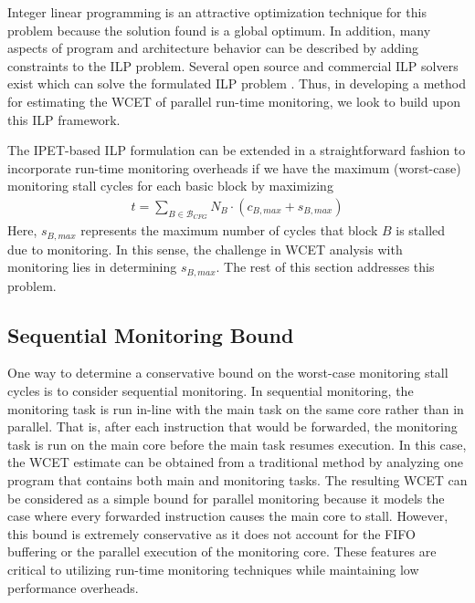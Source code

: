 Integer linear programming is an attractive optimization technique for this
problem because the solution found is a global optimum. In addition, many
aspects of program and architecture behavior can be described by adding
constraints to the ILP problem.  Several open source and commercial ILP solvers
exist which can solve the formulated ILP problem \cite{lpsolve, cplex}.  Thus,
in developing a method for estimating the WCET of parallel run-time monitoring,
we look to build upon this ILP framework.

The IPET-based ILP formulation can be extended in a straightforward fashion to
incorporate run-time monitoring overheads if we have the maximum (worst-case)
monitoring stall cycles for each basic block by maximizing
\begin{align*}
  t = \sum_{B \in \mathcal{B}_{CFG}}{N_{B} \cdot (c_{B,max} + s_{B,max})}
\end{align*}
Here, $s_{B,max}$ represents the maximum number of cycles that block $B$ is
stalled due to monitoring. In this sense, the challenge in WCET analysis with
monitoring lies in determining $s_{B,max}$.  The rest of this section addresses
this problem.

\subsection{Sequential Monitoring Bound}
\label{sec:monitoring_wcet.wcet.sequential}

One way to determine a conservative bound on the worst-case monitoring stall
cycles is to consider sequential monitoring.  In sequential monitoring, the
monitoring task is run in-line with the main task on the same core rather than
in parallel. That is, after each instruction that would be forwarded, the
monitoring task is run on the main core before the main task resumes execution.
In this case, the WCET estimate can be obtained from a traditional method by
analyzing one program that contains both main and monitoring tasks.  The
resulting WCET can be considered as a simple bound for parallel monitoring
because it models the case where every forwarded instruction causes the main
core to stall.  However, this bound is extremely conservative as it does not
account for the FIFO buffering or the parallel execution of the monitoring
core. These features are critical to utilizing run-time monitoring techniques
while maintaining low performance overheads.

